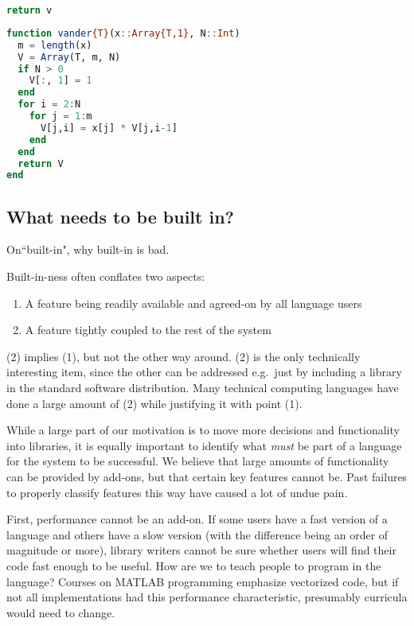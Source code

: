 {\begin{singlespace}
\begin{lstlisting}[language=python,style=ttcode]
  return v
\end{lstlisting}
\end{singlespace}


\begin{singlespace}
\begin{lstlisting}[language=julia]
function vander{T}(x::Array{T,1}, N::Int)
  m = length(x)
  V = Array(T, m, N)
  if N > 0
    V[:, 1] = 1
  end
  for i = 2:N
    for j = 1:m
      V[j,i] = x[j] * V[j,i-1]
    end
  end
  return V
end
\end{lstlisting}
\end{singlespace}

\subsection{What needs to be built in?}

On``built-in", why built-in is bad.

Built-in-ness often conflates two aspects:

\begin{enumerate}
\item A feature being readily available and agreed-on by all language users
\item A feature tightly coupled to the rest of the system
\end{enumerate}

(2) implies (1), but not the other way around. (2) is the only technically
interesting item, since the other can be addressed e.g.\  just by including
a library in the standard software distribution. Many technical computing
languages have done a large amount of (2) while justifying it with point (1).


While a large part of our motivation is to move more decisions and functionality
into libraries, it is equally important to identify what {\it  must} be part of a
language for the system to be successful. We believe that large amounts of
functionality can be provided by add-ons, but that certain key features
cannot be. Past failures to properly classify features this way have
caused a lot of undue pain.

First, performance cannot be an add-on. If some users have a fast version of
a language and others have a slow version (with the difference being an
order of magnitude or more), library writers cannot be sure whether users
will find their code fast enough to be useful. How are we to teach people to
program in the language? Courses on MATLAB programming emphasize vectorized code,
but if not all implementations had this performance characteristic,
presumably curricula would need to change.

}
